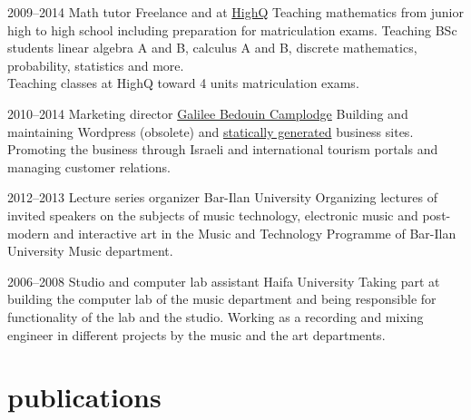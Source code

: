 \documentclass[]{friggeri-cv}  %
\begin{document}
\begin{entrylist}

    \entry
    {2009--2014}
    {Math tutor}
    {Freelance and at \href{http://high-q.co.il/}{HighQ}}
    {Teaching mathematics from junior high to high school including preparation for matriculation exams. Teaching BSc students linear algebra A and B, calculus A and B, discrete mathematics, probability, statistics and more.\\
    Teaching classes at HighQ toward 4 units matriculation exams.}

\end{entrylist}
\begin{entrylist}

    \entry
    {2010--2014}
    {Marketing director}
    {\href{http://www.galilee-bedouin-camplodge.com}{Galilee Bedouin Camplodge}}
    {Building and maintaining Wordpress (obsolete) and \href{http://www.galilee-bedouin-camplodge.com}{statically generated} business sites.
    Promoting the business through Israeli and international tourism portals and managing customer relations.}

\end{entrylist}
\begin{entrylist}

    \entry
    {2012--2013}
    {Lecture series organizer}
    {Bar-Ilan University}
    {Organizing lectures of invited speakers on the subjects of music technology, electronic music and post-modern and interactive art in the Music and Technology Programme of Bar-Ilan University Music department.}

\end{entrylist}
\begin{entrylist}

    \entry
    {2006--2008}
    {Studio and computer lab assistant}
    {Haifa University}
    {Taking part at building the computer lab of the music department and being responsible for functionality of the lab and the studio. Working as a recording and mixing engineer in different projects by the music and the art departments.}

\end{entrylist}


\section{publications}
\end{document}

